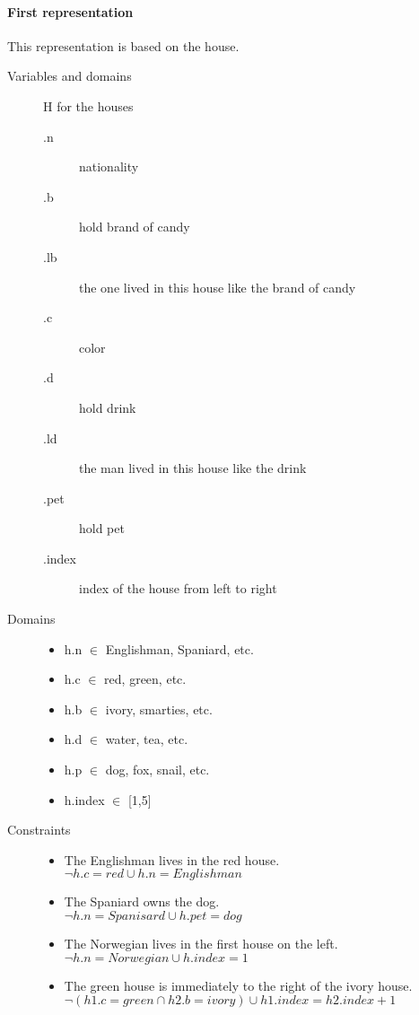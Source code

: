 \paragraph{First representation}
This representation is based on the house.
\begin{description}
\item [Variables and domains] H for the houses
  \begin{description}
  \item [.n] nationality
  \item [.b] hold brand of candy
  \item [.lb] the one lived in this house like the brand of candy
  \item [.c] color
  \item [.d] hold drink
  \item [.ld] the man lived in this house like the drink
  \item [.pet] hold pet
  \item [.index] index of the house from left to right
  \end{description}
\item [Domains]
  \begin{itemize}
  \item h.n $\in$ Englishman, Spaniard, etc.
  \item h.c $\in$ red, green, etc.
  \item h.b $\in$ ivory, smarties, etc.
  \item h.d $\in$ water, tea, etc.
  \item h.p $\in$ dog, fox, snail, etc.
  \item h.index $\in$ [1,5]
\end{itemize}
\item [Constraints]
  \begin{itemize}
  \item The Englishman lives in the red house. \\
    $\neg h.c=red \cup h.n=Englishman$
  \item The Spaniard owns the dog. \\
    $\neg h.n=Spanisard \cup h.pet=dog$
  \item The Norwegian lives in the first house on the left.\\
    $\neg h.n = Norwegian \cup h.index = 1$
  \item The green house is immediately to the right of the ivory house.\\
    $\neg (h1.c = green \cap h2.b = ivory) \cup h1.index = h2.index + 1$

\end{itemize}
\end{description}
